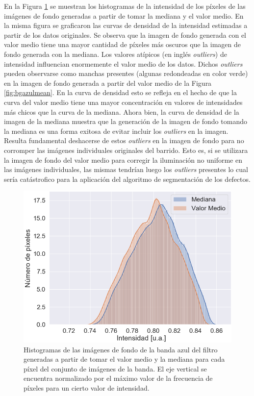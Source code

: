 En la Figura \ref{fig:comparhists} se muestran los histogramas de la intensidad de los píxeles de las imágenes de fondo generadas a partir de tomar la mediana y el valor medio. En la misma figura se graficaron las curvas de densidad de la intensidad estimadas a partir de los datos originales. Se observa que la imagen de fondo generada con el valor medio tiene una mayor cantidad de píxeles más oscuros que la imagen de fondo generada con la mediana. Los valores atípicos (en inglés \textit{outliers}) de intensidad influencian enormemente el valor medio de los datos. Dichos \textit{outliers} pueden observarse como manchas presentes (algunas redondeadas en color verde) en la imagen de fondo generada a partir del valor medio de la Figura \ref{fig:bgazulmean}. En la curva de densidad esto se refleja en el hecho de que la curva del valor medio tiene una mayor concentración en valores de intensidades más chicos que la curva de la mediana. Ahora bien, la curva de densidad de la imagen de la mediana muestra que la generación de la imagen de fondo tomando la mediana es una forma exitosa de evitar incluir los \textit{outliers} en la imagen. Resulta fundamental deshacerse de estos \textit{outliers} en la imagen de fondo para no corromper las imágenes individuales originales del barrido. Esto es, si se utilizara la imagen de fondo del valor medio para corregir la iluminación no uniforme en las imágenes individuales, las mismas tendrían luego los \textit{outliers} presentes lo cual sería catástrofico para la aplicación del algoritmo de segmentación de los defectos.
\begin{figure}[H]
	\centering
\includegraphics[scale=0.55]{Figs/defectosZEISS/comparhistsmedi.png}
\caption{Histogramas de las imágenes de fondo de la banda azul del filtro generadas a partir de tomar el valor medio y la mediana para cada píxel del conjunto de imágenes de la banda. El eje vertical se encuentra normalizado por el máximo valor de la frecuencia de píxeles para un cierto valor de intensidad.}
\label{fig:comparhists}
\end{figure}	
	
